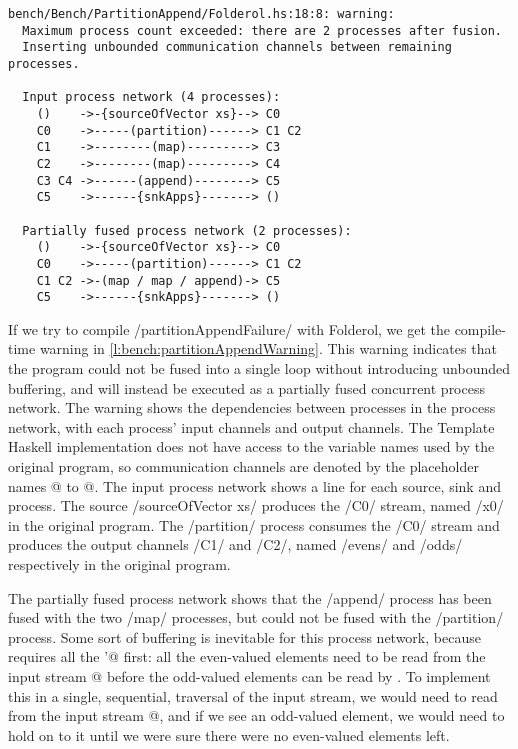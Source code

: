 \begin{lstlisting}[float,language=nil,label=l:bench:partitionAppendWarning,caption=Partition / append fusion failure compile-time warning]
bench/Bench/PartitionAppend/Folderol.hs:18:8: warning:
  Maximum process count exceeded: there are 2 processes after fusion.
  Inserting unbounded communication channels between remaining processes.

  Input process network (4 processes):
    ()    ->-{sourceOfVector xs}--> C0
    C0    ->-----(partition)------> C1 C2
    C1    ->--------(map)---------> C3
    C2    ->--------(map)---------> C4
    C3 C4 ->------(append)--------> C5
    C5    ->------{snkApps}-------> ()
  
  Partially fused process network (2 processes):
    ()    ->-{sourceOfVector xs}--> C0
    C0    ->-----(partition)------> C1 C2
    C1 C2 ->-(map / map / append)-> C5
    C5    ->------{snkApps}-------> ()
\end{lstlisting}

If we try to compile \Hs/partitionAppendFailure/ with Folderol, we get the compile-time warning in \cref{l:bench:partitionAppendWarning}.
This warning indicates that the program could not be fused into a single loop without introducing unbounded buffering, and will instead be executed as a partially fused concurrent process network.
The warning shows the dependencies between processes in the process network, with each process' input channels and output channels.
The Template Haskell implementation does not have access to the variable names used by the original program, so communication channels are denoted by the placeholder names @ to @.
The input process network shows a line for each source, sink and process.
The source \Hs/{sourceOfVector xs}/ produces the \Hs/C0/ stream, named \Hs/x0/ in the original program.
The \Hs/partition/ process consumes the \Hs/C0/ stream and produces the output channels \Hs/C1/ and \Hs/C2/, named \Hs/evens/ and \Hs/odds/ respectively in the original program.

The partially fused process network shows that the \Hs/append/ process has been fused with the two \Hs/map/ processes, but could not be fused with the \Hs/partition/ process.
Some sort of buffering is inevitable for this process network, because \Hs@append@ requires all the \Hs@evens'@ first: all the even-valued elements need to be read from the input stream @ before the odd-valued elements can be read by \Hs@append@.
To implement this in a single, sequential, traversal of the input stream, we would need to read from the input stream @, and if we see an odd-valued element, we would need to hold on to it until we were sure there were no even-valued elements left.

